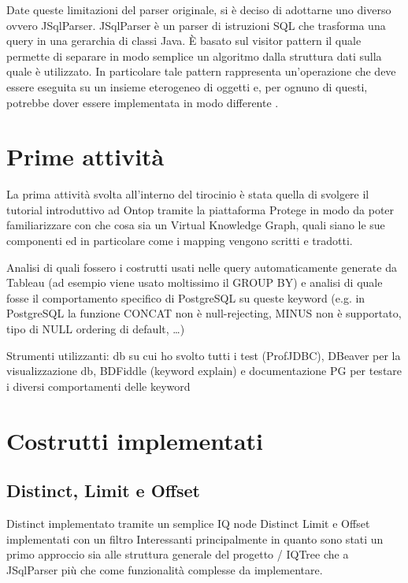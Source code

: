 \begin{comment}
    SELECT t.oid, t.*
    FROM pg_catalog.pg_tablespace t
    "ORDER BY t.oid";
    becomes:
    SELECT t.*
    FROM pg_catalog.pg_tablespace t;
\end{comment}
Date queste limitazioni del parser originale, si è deciso di adottarne uno diverso ovvero JSqlParser. JSqlParser è un parser di istruzioni SQL
che trasforma una query in una gerarchia di classi Java. \`E basato sul visitor pattern il quale permette di separare in modo semplice un algoritmo dalla struttura dati sulla quale è utilizzato. 
In particolare tale pattern rappresenta un'operazione che deve essere eseguita su un insieme eterogeneo di oggetti e, per ognuno di questi, potrebbe dover essere implementata in modo differente \cite{JSqlParser}.

\section{Prime attività}
\label{sec:prerequisits}
La prima attività svolta all'interno del tirocinio è stata quella di svolgere il tutorial introduttivo ad Ontop tramite la piattaforma Protege in modo da poter familiarizzare con 
che cosa sia un Virtual Knowledge Graph, quali siano le sue componenti ed in particolare come i mapping vengono scritti e tradotti.

Analisi di quali fossero i costrutti usati nelle query automaticamente generate da Tableau (ad esempio viene usato moltissimo il GROUP BY) e analisi di quale fosse il comportamento specifico di PostgreSQL su queste keyword
(e.g. in PostgreSQL la funzione CONCAT non è null-rejecting, MINUS non è supportato, tipo di NULL ordering di default, \dots)

Strumenti utilizzanti: db su cui ho svolto tutti i test (ProfJDBC), DBeaver per la visualizzazione db, BDFiddle (keyword explain) e documentazione PG per testare i diversi comportamenti delle keyword


\section{Costrutti implementati}
\label{sec:implementation}

\subsection{Distinct, Limit e Offset}

Distinct implementato tramite un semplice IQ node Distinct
Limit e Offset implementati con un filtro
Interessanti principalmente in quanto sono stati un primo approccio sia alle struttura generale del progetto / IQTree che a JSqlParser più che come funzionalità complesse da implementare.

